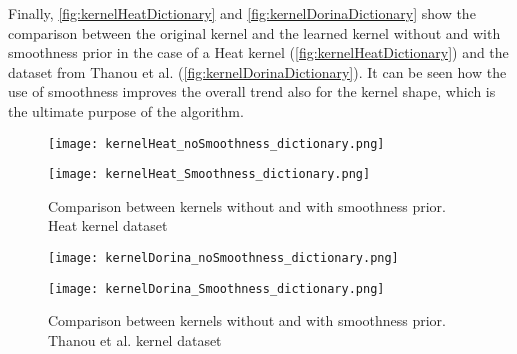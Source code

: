 Finally, \autoref{fig:kernelHeatDictionary} and \autoref{fig:kernelDorinaDictionary} show the comparison between the original kernel and the learned kernel without and with smoothness prior in the case of a Heat kernel (\autoref{fig:kernelHeatDictionary}) and the dataset from  Thanou et al. (\autoref{fig:kernelDorinaDictionary}). It can be seen how the use of smoothness improves the overall trend also for the kernel shape, which is the ultimate purpose of the algorithm.

\begin{figure}[htbp]
  \begin{minipage}[c]{.5\textwidth}
    \centering
    \texttt{[image: kernelHeat\_noSmoothness\_dictionary.png]}
  \end{minipage}
  \begin{minipage}[c]{.5\textwidth}
    \centering
    \texttt{[image: kernelHeat\_Smoothness\_dictionary.png]}
  \end{minipage}
  \caption{Comparison between kernels without and with smoothness prior. Heat kernel dataset}
  \label{fig:kernelHeatDictionary}
\end{figure}

\begin{figure}[htbp]
  \begin{minipage}[c]{.5\textwidth}
    \centering
    \texttt{[image: kernelDorina\_noSmoothness\_dictionary.png]}
  \end{minipage}
  \begin{minipage}[c]{.5\textwidth}
    \centering
    \texttt{[image: kernelDorina\_Smoothness\_dictionary.png]}
  \end{minipage}
  \caption{Comparison between kernels without and with smoothness prior. Thanou et al. kernel dataset}
  \label{fig:kernelDorinaDictionary}
\end{figure}

